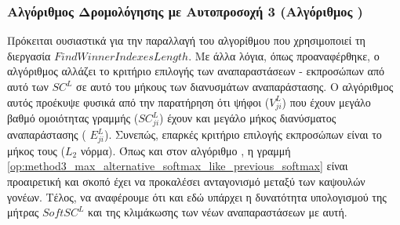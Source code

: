 \subsubsection{Αλγόριθμος Δρομολόγησης με Αυτο\textendash προσοχή 3 (Αλγόριθμος )}
Πρόκειται ουσιαστικά για την παραλλαγή του αλγορίθμου  που χρησιμοποιεί τη διεργασία $FindWinnerIndexesLength$. Με άλλα λόγια, όπως προαναφέρθηκε, ο αλγόριθμος  αλλάζει το κριτήριο επιλογής των αναπαραστάσεων - εκπροσώπων από αυτό των $SC^L$ σε αυτό του μήκους των διανυσμάτων αναπαράστασης. Ο αλγόριθμος αυτός προέκυψε φυσικά από την παρατήρηση ότι ψήφοι ($V^L_{ji}$) που έχουν μεγάλο βαθμό ομοιότητας γραμμής ($SC^L_{ji}$) έχουν και μεγάλο μήκος διανύσματος αναπαράστασης ( $E^L_{ji}$). Συνεπώς, επαρκές κριτήριο επιλογής εκπροσώπων είναι το μήκος τους ($L_2$ νόρμα). Όπως και στον αλγόριθμο , η γραμμή \ref{op:method3_max_alternative_softmax_like_previous_softmax} είναι προαιρετική και σκοπό έχει να προκαλέσει ανταγονισμό μεταξύ των καψουλών γονέων. Τέλος, να αναφέρουμε ότι και εδώ υπάρχει η δυνατότητα υπολογισμού της μήτρας $SoftSC^L$ και της κλιμάκωσης των νέων αναπαραστάσεων με αυτή.


